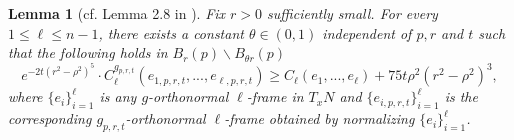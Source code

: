 \documentclass[11pt]{amsart}
\newtheorem{lemma}[theorem]{Lemma}
\theoremstyle{definition}
\theoremstyle{remark}
\numberwithin{equation}{section}
\begin{document}
    \begin{lemma}[cf. Lemma 2.8 in \cite{chuleezhu_n_systole}]\label{C_m lower bound}
        Fix $r>0$ sufficiently small. For every $1\leq\ell\leq n-1$, there exists a constant
          $\theta\in(0,1)$
          independent of $p,r$ and $t$ such that the following holds in $B_{r}(p)\backslash
          B_{\theta r}(p)$
        \[
        e^{-2t(r^2-\rho^2)^{5}}\cdot C_{\ell}^{g_{p,r,t}}(e_{1,p,r,t},...,e_{\ell,p,r,t})\geq
          C_{\ell}(e_{1},...,e_{\ell})+75t\rho^2(r^2-\rho^2)^{3},
        \]
        where $\{e_{i}\}_{i=1}^{\ell}$ is any $g$-orthonormal $\ell$-frame in $T_xN$ and
          $\{e_{i,p,r,t}\}_{i=1}^{\ell}$ is the corresponding $g_{p,r,t}$-orthonormal
          $\ell$-frame obtained by normalizing $\{e_i\}_{i=1}^{\ell}$.
    \end{lemma}
\end{document}
